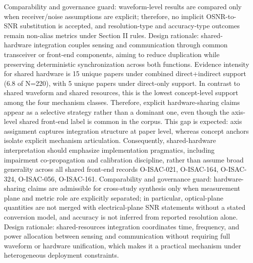 {}Comparability and governance guard: waveform-level results are compared only when receiver/noise assumptions are explicit; therefore, no implicit OSNR-to-SNR substitution is accepted, and resolution-type and accuracy-type outcomes remain non-alias metrics under Section II rules.\markdownRendererInterblockSeparator
{}
\markdownRendererSectionEnd \markdownRendererSectionBegin
{}\markdownRendererInterblockSeparator
{}Design rationale: shared-hardware integration couples sensing and communication through common transceiver or front-end components, aiming to reduce duplication while preserving deterministic synchronization across both functions.\markdownRendererParagraphSeparator
{}Evidence intensity for shared hardware is 15 unique papers under combined direct+indirect support (6.8\markdownRendererPercentSign{} of N=220), with 5 unique papers under direct-only support. In contrast to shared waveform and shared resources, this is the lowest concept-level support among the four mechanism classes. Therefore, explicit hardware-sharing claims appear as a selective strategy rather than a dominant one, even though the axis-level shared front-end label is common in the corpus. This gap is expected: axis assignment captures integration structure at paper level, whereas concept anchors isolate explicit mechanism articulation. Consequently, shared-hardware interpretation should emphasize implementation pragmatics, including impairment co-propagation and calibration discipline, rather than assume broad generality across all shared front-end records O-ISAC-021, O-ISAC-164, O-ISAC-324, O-ISAC-056, O-ISAC-161.\markdownRendererParagraphSeparator
{}Comparability and governance guard: hardware-sharing claims are admissible for cross-study synthesis only when measurement plane and metric role are explicitly separated; in particular, optical-plane quantities are not merged with electrical-plane SNR statements without a stated conversion model, and accuracy is not inferred from reported resolution alone.\markdownRendererInterblockSeparator
{}
\markdownRendererSectionEnd \markdownRendererSectionBegin
{}\markdownRendererInterblockSeparator
{}Design rationale: shared-resources integration coordinates time, frequency, and power allocation between sensing and communication without requiring full waveform or hardware unification, which makes it a practical mechanism under heterogeneous deployment constraints.\markdownRendererParagraphSeparator
